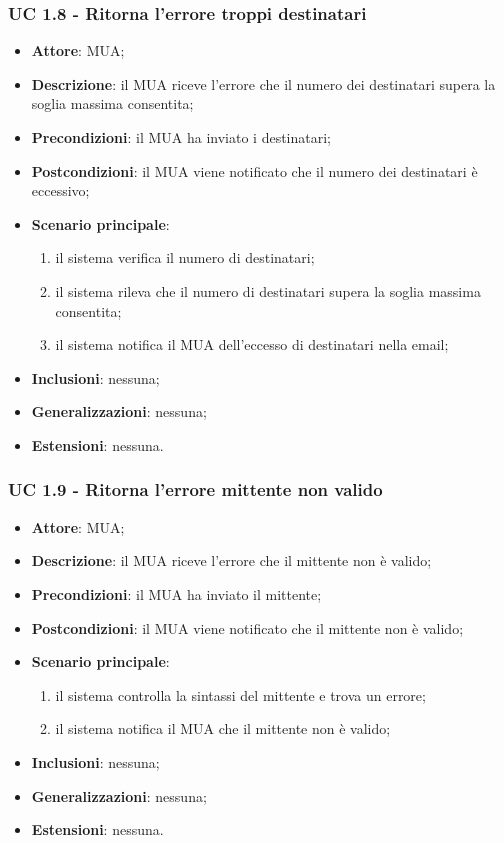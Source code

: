     \subsubsection{UC 1.8 - Ritorna l'errore troppi destinatari} \label{sec:UC1.8}
    \begin{itemize}
        \item \textbf{Attore}: MUA;
        \item \textbf{Descrizione}: il MUA riceve l'errore che il numero dei destinatari supera la soglia massima consentita;
        \item \textbf{Precondizioni}: il MUA ha inviato i destinatari;
        \item \textbf{Postcondizioni}: il MUA viene notificato che il numero dei destinatari è eccessivo;
        \item \textbf{Scenario principale}:
            \begin{enumerate}
                \item il sistema verifica il numero di destinatari;
                \item il sistema rileva che il numero di destinatari supera la soglia massima consentita;
                \item il sistema notifica il MUA dell'eccesso di destinatari nella email;
            \end{enumerate}
        \item \textbf{Inclusioni}: nessuna;
        \item \textbf{Generalizzazioni}: nessuna;
        \item \textbf{Estensioni}: nessuna.
    \end{itemize}


    \subsubsection{UC 1.9 - Ritorna l'errore mittente non valido} \label{sec:UC1.9}
    \begin{itemize}
        \item \textbf{Attore}: MUA;
        \item \textbf{Descrizione}: il MUA riceve l'errore che il mittente non è valido;
        \item \textbf{Precondizioni}: il MUA ha inviato il mittente;
        \item \textbf{Postcondizioni}: il MUA viene notificato che il mittente non è valido;
        \item \textbf{Scenario principale}:
            \begin{enumerate}
                \item il sistema controlla la sintassi del mittente e trova un errore;
                \item il sistema notifica il MUA che il mittente non è valido;
            \end{enumerate}
        \item \textbf{Inclusioni}: nessuna;
        \item \textbf{Generalizzazioni}: nessuna;
        \item \textbf{Estensioni}: nessuna.
    \end{itemize}



